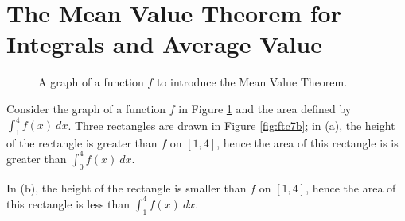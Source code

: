 \section{The Mean Value Theorem for Integrals and Average Value}{}{}\label{sec:Average Value}


\begin{figure}[H]
\caption{A graph of a function $f$ to introduce the Mean Value Theorem.\label{fig:ftc7a}} 
\end{figure}

Consider the graph of a function $f$ in Figure \ref{fig:ftc7a} and the area defined by $\int_1^4 f(x)\ dx$. Three rectangles are drawn in Figure \ref{fig:ftc7b}; in (a), the height of the rectangle is greater than $f$ on $[1,4]$, hence the area of this rectangle is is greater than $\int_0^4 f(x)\ dx$. 

In (b), the height of the rectangle is smaller than $f$ on $[1,4]$, hence the area of this rectangle is less than $\int_1^4 f(x)\ dx$.


